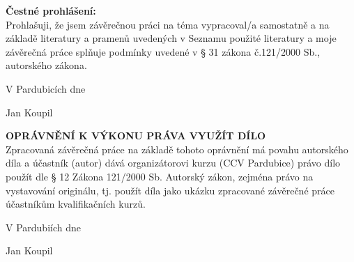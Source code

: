





\newpage

\setcounter{page}{1}

\vspace*{\fill}

\noindent \textbf{Čestné prohlášení:} \\

Prohlašuji, že jsem závěrečnou práci na téma \textbf{\topic}
vypracoval/a samostatně a na základě literatury a pramenů uvedených v Seznamu použité literatury a moje závěrečná práce splňuje podmínky uvedené v § 31 zákona č.121/2000 Sb., autorského zákona.

\vspace{1cm}

\hfill V Pardubicích dne \dotfill  
\vspace{1cm}

\hfill
Jan Koupil

\newpage

\vspace*{\fill}

\noindent \textbf{OPRÁVNĚNÍ K VÝKONU PRÁVA VYUŽÍT DÍLO} \\

Zpracovaná závěrečná práce na základě tohoto oprávnění má povahu autorského díla a účastník (autor) dává organizátorovi kurzu (CCV Pardubice) právo dílo použít dle § 12 Zákona 121/2000 Sb. Autorský zákon, zejména právo na vystavování originálu, tj. použít díla jako ukázku zpracované závěrečné práce účastníkům kvalifikačních kurzů.

\vspace{1cm}

\hfill V Pardubiích dne \dotfill  

\hfill
Jan Koupil

\newpage

